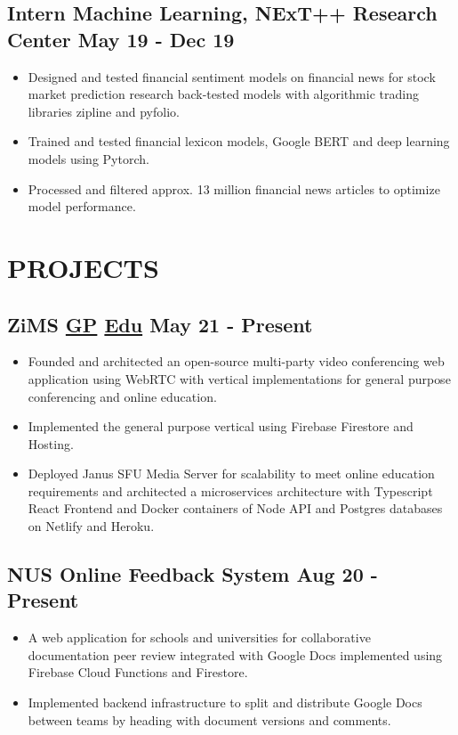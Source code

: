 \documentclass[11pts]{article}
\begin{document}
\subsection*{ Intern Machine Learning, NExT++ Research Center \href{https://github.com/GelliFrancesco/assetpriceprediction}{\faGithub} \hfill May 19 - Dec 19}
\begin{itemize}
    \item Designed and tested financial sentiment models on financial news for stock market prediction research back-tested models with algorithmic trading libraries zipline and pyfolio.
    \item Trained and tested financial lexicon models, Google BERT and deep learning models using Pytorch.
    \item Processed and filtered approx. 13 million financial news articles to optimize model performance.
\end{itemize}

\section*{PROJECTS}

\subsection*{ZiMS \href{https://github.com/yzia2000/zims-mesh}{\faGithub GP} \href{https://github.com/yzia2000/zims}{\faGithub Edu} \hfill May 21 - Present}
\begin{itemize}
    \item Founded and architected an open-source multi-party video conferencing web application using WebRTC with vertical implementations for general purpose conferencing and online education.
    \item Implemented the general purpose vertical using Firebase Firestore and Hosting.
    \item Deployed Janus SFU Media Server for scalability to meet online education requirements and architected a microservices architecture with Typescript React Frontend and Docker containers of Node API and Postgres databases on Netlify and Heroku.
\end{itemize}

\subsection*{NUS Online Feedback System \href{https://youtu.be/LVmKodrE8e0}{\faYoutube} \hfill Aug 20 - Present}
\begin{itemize}
    \item A web application for schools and universities for collaborative documentation peer review integrated with Google Docs implemented using Firebase Cloud Functions and Firestore.
    \item Implemented backend infrastructure to split and distribute Google Docs between teams by heading with document versions and comments.
\end{itemize}
\end{document}
